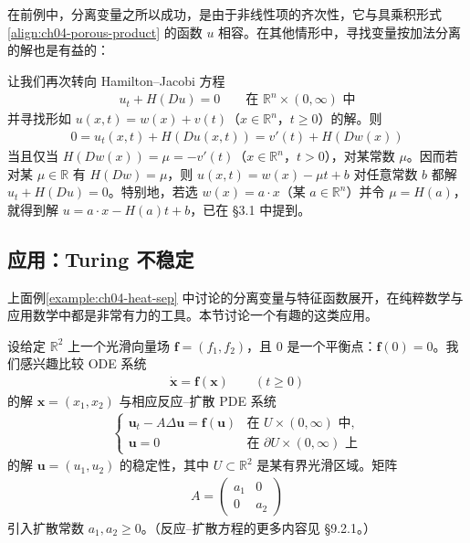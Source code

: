 \documentclass[../../main.tex]{subfiles}
\begin{document}
在前例中，分离变量之所以成功，是由于非线性项的齐次性，它与具乘积形式\eqref{align:ch04-porous-product} 的函数 $u$ 相容。在其他情形中，寻找变量按加法分离的解也是有益的：

\begin{example}\label{example:ch04-hj-sep}
让我们再次转向 Hamilton--Jacobi 方程
\begin{align}\label{align:ch04-hj-sep}
u_t+H(Du)=0 \qquad\text{在 }\mathbb{R}^n\times(0,\infty)\text{ 中}
\end{align}
并寻找形如 $u(x,t)=w(x)+v(t)$（$x\in\mathbb{R}^n$，$t\geqslant 0$）的解。则
\begin{align*}
0=u_t(x,t)+H(Du(x,t))=v'(t)+H(Dw(x))
\end{align*}
当且仅当 $H(Dw(x))=\mu=-v'(t)$（$x\in\mathbb{R}^n$，$t>0$），对某常数 $\mu$。因而若对某 $\mu\in\mathbb{R}$ 有 $H(Dw)=\mu$，则 $u(x,t)=w(x)-\mu t+b$ 对任意常数 $b$ 都解 $u_t+H(Du)=0$。特别地，若选 $w(x)=a\cdot x$（某 $a\in\mathbb{R}^n$）并令 $\mu=H(a)$，就得到解 $u=a\cdot x-H(a)t+b$，已在 \S3.1 中提到。
\end{example}

\subsection{应用：Turing 不稳定}\label{subsection:ch04-turing}

上面例\cref{example:ch04-heat-sep} 中讨论的分离变量与特征函数展开，在纯粹数学与应用数学中都是非常有力的工具。本节讨论一个有趣的这类应用。

设给定 $\mathbb{R}^2$ 上一个光滑向量场 $\mathbf{f}=(f_1,f_2)$，且 $0$ 是一个平衡点：$\mathbf{f}(0)=0$。我们感兴趣比较 ODE 系统
\begin{align}\label{align:ch04-ode-sys}
\dot{\mathbf{x}}=\mathbf{f}(\mathbf{x}) \qquad(t\geqslant 0)
\end{align}
的解 $\mathbf{x}=(x_1,x_2)$ 与相应反应--扩散 PDE 系统
\begin{align}\label{align:ch04-rd-sys}
\begin{cases}
\mathbf{u}_t-A\Delta\mathbf{u}=\mathbf{f}(\mathbf{u}) & \text{在 }U\times(0,\infty)\text{ 中},\\
\mathbf{u}=0 & \text{在 }\partial U\times(0,\infty)\text{ 上}
\end{cases}
\end{align}
的解 $\mathbf{u}=(u_1,u_2)$ 的稳定性，其中 $U\subset\mathbb{R}^2$ 是某有界光滑区域。矩阵
\begin{align*}
A=\begin{pmatrix}a_1&0\\0&a_2\end{pmatrix}
\end{align*}
引入扩散常数 $a_1,a_2\geqslant 0$。（反应--扩散方程的更多内容见 \S9.2.1。）
\end{document}
